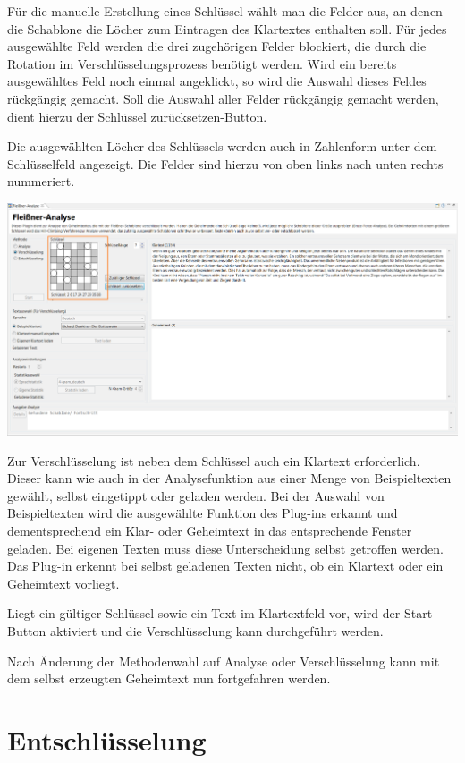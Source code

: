 \documentclass[fontsize=12pt, DIV=15, parskip=half-]{scrartcl}
\theoremstyle{break}
\begin{document}
Für die manuelle Erstellung eines Schlüssel wählt man die Felder aus, an denen die Schablone die Löcher zum Eintragen des Klartextes enthalten soll. Für jedes ausgewählte Feld werden die drei zugehörigen Felder blockiert, die durch die Rotation im Verschlüsselungsprozess benötigt werden. Wird ein bereits ausgewähltes Feld noch einmal angeklickt, so wird die Auswahl dieses Feldes rückgängig gemacht. Soll die Auswahl aller Felder rückgängig gemacht werden, dient hierzu der \glqq Schlüssel zurücksetzen\grqq -Button.

Die ausgewählten Löcher des Schlüssels werden auch in Zahlenform unter dem Schlüsselfeld angezeigt. Die Felder sind hierzu von oben links nach unten rechts nummeriert.

\includegraphics[scale=0.45]{FleissnerEncryptKeySelection.png}



Zur Verschlüsselung ist neben dem Schlüssel auch ein Klartext erforderlich. Dieser kann wie auch in der Analysefunktion aus einer Menge von Beispieltexten gewählt, selbst eingetippt oder geladen werden. Bei der Auswahl von Beispieltexten wird die ausgewählte Funktion des Plug-ins erkannt und dementsprechend ein Klar- oder Geheimtext in das entsprechende Fenster geladen. Bei eigenen Texten muss diese Unterscheidung selbst getroffen werden. Das Plug-in erkennt bei selbst geladenen Texten nicht, ob ein Klartext oder ein Geheimtext vorliegt.

Liegt ein gültiger Schlüssel sowie ein Text im Klartextfeld vor, wird der \glqq Start\grqq -Button aktiviert und die Verschlüsselung kann durchgeführt werden. 

Nach Änderung der Methodenwahl auf \glqq Analyse\grqq{} oder \glqq Verschlüsselung\grqq{} kann mit dem selbst erzeugten Geheimtext nun fortgefahren werden.

\section{Entschlüsselung}\hypertarget{entschl}{}
\end{document}
